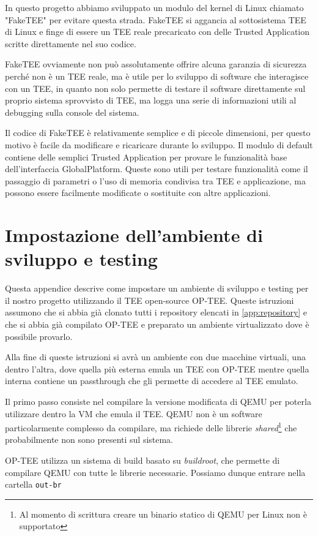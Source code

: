 \documentclass[12pt,italian]{report}
\begin{document}
In questo progetto abbiamo sviluppato un modulo del kernel di Linux chiamato
"FakeTEE" per evitare questa strada. FakeTEE si aggancia al sottosistema TEE
di Linux e finge di essere un TEE reale precaricato con delle
Trusted Application scritte direttamente nel suo codice.

FakeTEE ovviamente non può assolutamente offrire alcuna garanzia di sicurezza
perché non è un TEE reale, ma è utile per lo sviluppo di software che
interagisce con un TEE, in quanto non solo permette di testare il software
direttamente sul proprio sistema sprovvisto di TEE, ma logga una serie di
informazioni utili al debugging sulla console del sistema.

Il codice di FakeTEE è relativamente semplice e di piccole dimensioni, per
questo motivo è facile da modificare e ricaricare durante lo sviluppo.
Il modulo di default contiene delle semplici Trusted Application per provare
le funzionalità base dell'interfaccia GlobalPlatform.
Queste sono utili per testare funzionalità come il passaggio di parametri o
l'uso di memoria condivisa tra TEE e applicazione, ma possono essere
facilmente modificate o sostituite con altre applicazioni.

\chapter{Impostazione dell'ambiente di sviluppo e testing}
\label{app:impostazione-ambiente-sviluppo-testing}
Questa appendice descrive come impostare un ambiente di sviluppo e testing
per il nostro progetto utilizzando il TEE open-source OP-TEE.
Queste istruzioni assumono che si abbia già clonato tutti i repository
elencati in \ref{app:repository} e che si abbia già compilato OP-TEE e
preparato un ambiente virtualizzato dove è possibile provarlo.

Alla fine di queste istruzioni si avrà un ambiente con due macchine virtuali,
una dentro l'altra, dove quella più esterna emula un TEE con OP-TEE mentre
quella interna contiene un passthrough che gli permette di accedere al TEE
emulato.

Il primo passo consiste nel compilare la versione modificata di QEMU per
poterla utilizzare dentro la VM che emula il TEE.
QEMU non è un software particolarmente complesso da compilare, ma richiede
delle librerie \textit{shared}\footnote{
    Al momento di scrittura creare un binario statico di QEMU per Linux
    non è supportato
} che probabilmente non sono presenti sul sistema.

OP-TEE utilizza un sistema di build basato su \textit{buildroot}, che
permette di compilare QEMU con tutte le librerie necessarie.
Possiamo dunque entrare nella cartella \texttt{out-br}
\end{document}
